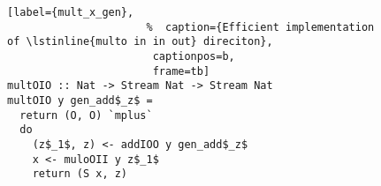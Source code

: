 \begin{figure}[!t]
  \centering
  \begin{minipage}{\columnwidth}
    \begin{lstlisting}[label={mult_x_gen},
                      %  caption={Efficient implementation of \lstinline{multo in in out} direciton},
                       captionpos=b,
                       frame=tb]
multOIO :: Nat -> Stream Nat -> Stream Nat
multOIO y gen_add$_z$ =
  return (O, O) `mplus`
  do
    (z$_1$, z) <- addIOO y gen_add$_z$
    x <- muloOII y z$_1$
    return (S x, z)
    \end{lstlisting}
  \end{minipage}
\end{figure}
